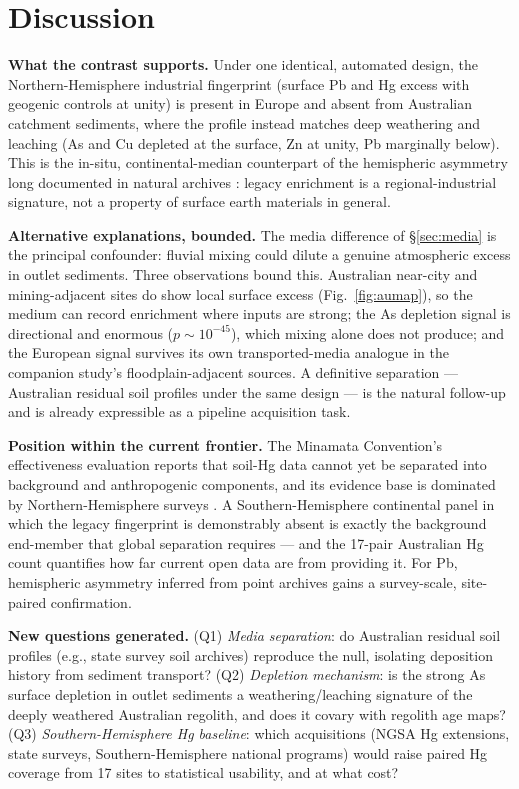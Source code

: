 \documentclass[11pt]{article}
\begin{document}
\section{Discussion}

\textbf{What the contrast supports.} Under one identical, automated design,
the Northern-Hemisphere industrial fingerprint (surface Pb and Hg excess
with geogenic controls at unity) is present in Europe and absent from
Australian catchment sediments, where the profile instead matches deep
weathering and leaching (As and Cu depleted at the surface, Zn at unity, Pb
marginally below). This is the in-situ, continental-median counterpart of
the hemispheric asymmetry long documented in natural archives
\cite{marx2016}: legacy enrichment is a regional-industrial signature, not a
property of surface earth materials in general.

\textbf{Alternative explanations, bounded.} The media difference of
\S\ref{sec:media} is the principal confounder: fluvial mixing could dilute a
genuine atmospheric excess in outlet sediments. Three observations bound
this. Australian near-city and mining-adjacent sites do show local surface
excess (Fig.~\ref{fig:aumap}), so the medium can record enrichment where
inputs are strong; the As depletion signal is directional and enormous
($p{\sim}10^{-45}$), which mixing alone does not produce; and the European
signal survives its own transported-media analogue in the companion study's
floodplain-adjacent sources. A definitive separation --- Australian residual
soil profiles under the same design --- is the natural follow-up and is
already expressible as a pipeline acquisition task.

\textbf{Position within the current frontier.} The Minamata Convention's
effectiveness evaluation reports that soil-Hg data cannot yet be separated
into background and anthropogenic components, and its evidence base is
dominated by Northern-Hemisphere surveys \cite{unep2025}. A
Southern-Hemisphere continental panel in which the legacy fingerprint is
demonstrably absent is exactly the background end-member that global
separation requires --- and the 17-pair Australian Hg count quantifies how
far current open data are from providing it. For Pb, hemispheric asymmetry
inferred from point archives \cite{marx2016} gains a survey-scale,
site-paired confirmation.

\textbf{New questions generated.} (Q1) \emph{Media separation}: do
Australian residual soil profiles (e.g., state survey soil archives)
reproduce the null, isolating deposition history from sediment transport?
(Q2) \emph{Depletion mechanism}: is the strong As surface depletion in
outlet sediments a weathering/leaching signature of the deeply weathered
Australian regolith, and does it covary with regolith age maps? (Q3)
\emph{Southern-Hemisphere Hg baseline}: which acquisitions (NGSA Hg
extensions, state surveys, Southern-Hemisphere national programs) would
raise paired Hg coverage from 17 sites to statistical usability, and at what
cost?
\end{document}
